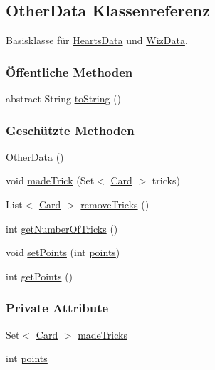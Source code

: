 \hypertarget{a00064}{\subsection{Other\-Data Klassenreferenz}
\label{a00064}
}


Basisklasse für \hyperlink{a00063}{Hearts\-Data} und \hyperlink{a00071}{Wiz\-Data}.

\subsubsection*{Öffentliche Methoden}
\begin{DoxyCompactItemize}
\item 
\hypertarget{a00064_a77e2151cf49df9f80a4999e0e9e54d55}{abstract String \hyperlink{a00064_a77e2151cf49df9f80a4999e0e9e54d55}{to\-String} ()}\label{a00064_a77e2151cf49df9f80a4999e0e9e54d55}

\end{DoxyCompactItemize}
\subsubsection*{Geschützte Methoden}
\begin{DoxyCompactItemize}
\item 
\hypertarget{a00064_a857cb9ffd8d9e2e10616eb5f28140092}{\hyperlink{a00064_a857cb9ffd8d9e2e10616eb5f28140092}{Other\-Data} ()}\label{a00064_a857cb9ffd8d9e2e10616eb5f28140092}

\item 
void \hyperlink{a00064_aef3e585a8e80c4983a80847e9fe75c4e}{made\-Trick} (Set$<$ \hyperlink{a00054}{Card} $>$ tricks)
\item 
List$<$ \hyperlink{a00054}{Card} $>$ \hyperlink{a00064_acbe5a7d8a4d5b8bd0576dc1f288e5511}{remove\-Tricks} ()
\item 
int \hyperlink{a00064_a0bb789bf164652b6b15609e8efd3e422}{get\-Number\-Of\-Tricks} ()
\item 
void \hyperlink{a00064_a284323bbb05781ca701f6b0b6bc428a6}{set\-Points} (int \hyperlink{a00064_af7f8f4a4e39e09fdb5e9f02330ecabef}{points})
\item 
int \hyperlink{a00064_a2bfc3c1acea7211e0fc7494cf8ef4188}{get\-Points} ()
\end{DoxyCompactItemize}
\subsubsection*{Private Attribute}
\begin{DoxyCompactItemize}
\item 
\hypertarget{a00064_a566d6db6591b09356fc88c8f664c65dd}{Set$<$ \hyperlink{a00054}{Card} $>$ \hyperlink{a00064_a566d6db6591b09356fc88c8f664c65dd}{made\-Tricks}}\label{a00064_a566d6db6591b09356fc88c8f664c65dd}

\item 
\hypertarget{a00064_af7f8f4a4e39e09fdb5e9f02330ecabef}{int \hyperlink{a00064_af7f8f4a4e39e09fdb5e9f02330ecabef}{points}}\label{a00064_af7f8f4a4e39e09fdb5e9f02330ecabef}

\end{DoxyCompactItemize}


